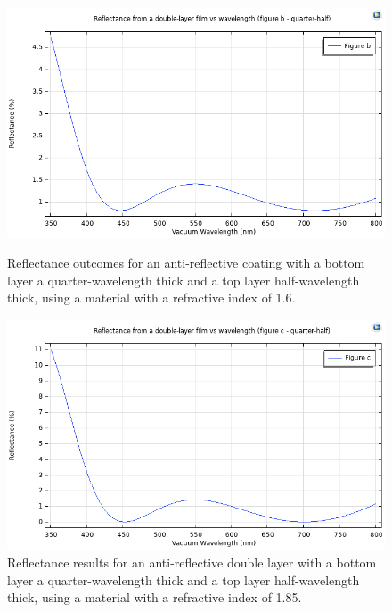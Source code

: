 \begin{figure}[H]
\begin{minipage}{0.45\textwidth}
    \label{fig:Antireflective Figure a}
  \end{minipage}
  \begin{minipage}{0.45\textwidth}
    \centering
    \includegraphics[width=\textwidth]{Chapters/Figures/Chapter 4 Figures/Anti-Reflectance Figure b.png}
    \caption{Reflectance outcomes for an anti-reflective coating with a bottom layer a quarter-wavelength thick and a top layer half-wavelength thick, using a material with a refractive index of 1.6.}
    \label{fig:Antireflective Figure b}
  \end{minipage}\hfill
  \begin{minipage}{0.45\textwidth}
    \centering
    \includegraphics[width=\textwidth]{Chapters/Figures/Chapter 4 Figures/Anti-Reflectance Figure c.png}
    \caption{Reflectance results for an anti-reflective double layer with a bottom layer a quarter-wavelength thick and a top layer half-wavelength thick, using a material with a refractive index of 1.85.}
    \label{fig:Antireflective Figure c}
  \end{minipage}
\end{figure}

